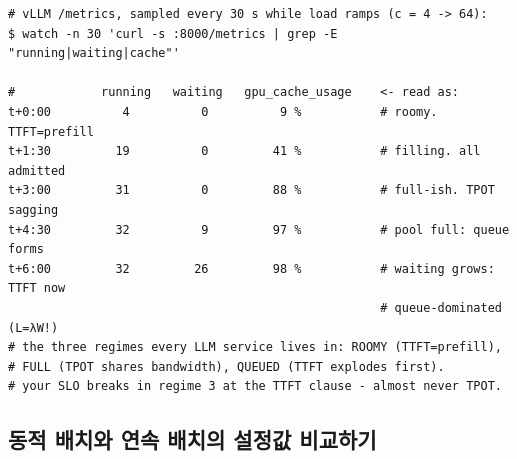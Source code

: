 \begin{terminalbox}
\begin{Verbatim}[breaklines=true,breakanywhere=true,fontsize=\small,formatcom=\color{tbbtermfg},codes=\tbbcodeactive]
# vLLM /metrics, sampled every 30 s while load ramps (c = 4 -> 64):
$ watch -n 30 'curl -s :8000/metrics | grep -E "running|waiting|cache"'

#            running   waiting   gpu_cache_usage    <- read as:
t+0:00          4          0          9 %           # roomy. TTFT=prefill
t+1:30         19          0         41 %           # filling. all admitted
t+3:00         31          0         88 %           # full-ish. TPOT sagging
t+4:30         32          9         97 %           # pool full: queue forms
t+6:00         32         26         98 %           # waiting grows: TTFT now
                                                    # queue-dominated (L=λW!)
# the three regimes every LLM service lives in: ROOMY (TTFT=prefill),
# FULL (TPOT shares bandwidth), QUEUED (TTFT explodes first).
# your SLO breaks in regime 3 at the TTFT clause - almost never TPOT.
\end{Verbatim}
\end{terminalbox}

\subsection*{동적 배치와 연속 배치의 설정값 비교하기}

